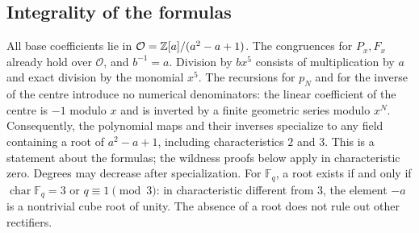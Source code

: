 \subsection{Integrality of the formulas}
All base coefficients lie in
$\mathcal O={\mathbb Z}[a]/(a^2-a+1)$. The congruences for $P_x,F_x$ already hold
over $\mathcal O$, and $b^{-1}=a$. Division by $bx^5$ consists of
multiplication by $a$ and exact division by the monomial $x^5$.
The recursions for $p_N$ and for the inverse of the centre introduce no
numerical denominators: the linear coefficient of the centre is $-1$
modulo $x$ and is inverted by a finite geometric series modulo $x^N$.
Consequently, the polynomial maps and their inverses specialize to any field
containing a root of $a^2-a+1$, including characteristics $2$ and $3$.
This is a statement about the formulas; the wildness proofs below apply in
characteristic zero. Degrees may decrease after specialization.
For $\mathbb F_q$, a root exists if and only if
$\operatorname{char}\mathbb F_q=3$ or $q\equiv1\pmod3$:
in characteristic different from $3$, the element $-a$ is a nontrivial
cube root of unity. The absence of a root does not rule out other rectifiers.
